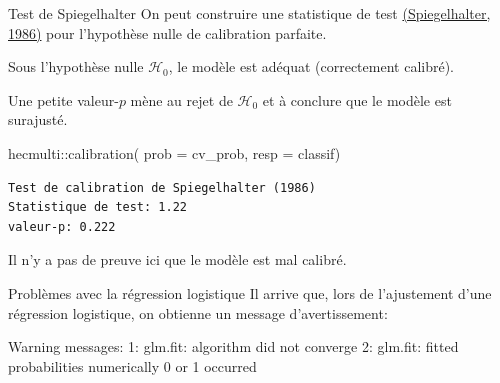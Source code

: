 \documentclass[
  ignorenonframetext,
]{beamer}
\newenvironment{Shaded}{\begin{snugshade}}{\end{snugshade}}
\newcommand{\AttributeTok}[1]{\textcolor[rgb]{0.40,0.45,0.13}{#1}}
\newcommand{\DecValTok}[1]{\textcolor[rgb]{0.68,0.00,0.00}{#1}}
\newcommand{\FunctionTok}[1]{\textcolor[rgb]{0.28,0.35,0.67}{#1}}
\newcommand{\NormalTok}[1]{\textcolor[rgb]{0.00,0.23,0.31}{#1}}
\newcommand{\SpecialCharTok}[1]{\textcolor[rgb]{0.37,0.37,0.37}{#1}}
\begin{document}
\begin{frame}[fragile]{Test de Spiegelhalter}
\protect\hypertarget{test-de-spiegelhalter}{}
On peut construire une statistique de test
\href{https://doi.org/10.1002/sim.4780050506}{(Spiegelhalter, 1986)}
pour l'hypothèse nulle de calibration parfaite.

Sous l'hypothèse nulle \(\mathcal{H}_0\), le modèle est adéquat
(correctement calibré).

Une petite valeur-\(p\) mène au rejet de \(\mathcal{H}_0\) et à conclure
que le modèle est surajusté.

\begin{Shaded}
\begin{Highlighting}[numbers=left,,]
\NormalTok{hecmulti}\SpecialCharTok{::}\FunctionTok{calibration}\NormalTok{(}
   \AttributeTok{prob =}\NormalTok{ cv\_prob, }
   \AttributeTok{resp =}\NormalTok{ classif)}
\end{Highlighting}
\end{Shaded}

\begin{verbatim}
Test de calibration de Spiegelhalter (1986)
Statistique de test: 1.22 
valeur-p: 0.222
\end{verbatim}

Il n'y a pas de preuve ici que le modèle est mal calibré.
\end{frame}

\begin{frame}[fragile]{Problèmes avec la régression logistique}
\protect\hypertarget{probluxe8mes-avec-la-ruxe9gression-logistique}{}
Il arrive que, lors de l'ajustement d'une régression logistique, on
obtienne un message d'avertissement:

\footnotesize

\begin{Shaded}
\begin{Highlighting}[numbers=left,,]
\NormalTok{Warning messages}\SpecialCharTok{:}
\DecValTok{1}\SpecialCharTok{:}\NormalTok{ glm.fit}\SpecialCharTok{:}\NormalTok{ algorithm did not converge }
\DecValTok{2}\SpecialCharTok{:}\NormalTok{ glm.fit}\SpecialCharTok{:}\NormalTok{ fitted probabilities numerically }\DecValTok{0}\NormalTok{ or }\DecValTok{1}\NormalTok{ occurred }
\end{Highlighting}
\end{Shaded}

\normalsize
\end{frame}
\end{document}
